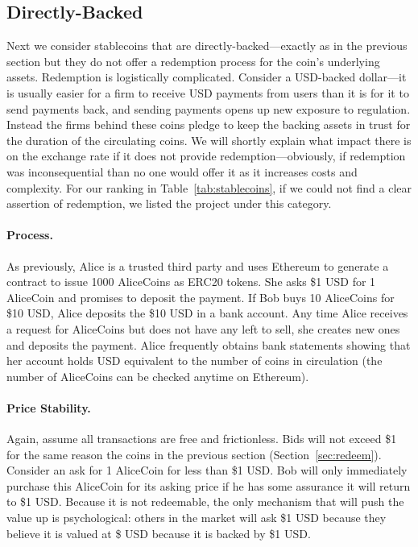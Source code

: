 
\subsection{Directly-Backed}
\label{sec:tether}

Next we consider stablecoins that are directly-backed---exactly as in the previous section but they do not offer a redemption process for the coin's underlying assets. Redemption is logistically complicated. Consider a USD-backed dollar---it is usually easier for a firm to receive USD payments from users than it is for it to send payments back, and sending payments opens up new exposure to regulation. Instead the firms behind these coins  pledge to keep the backing assets in trust for the duration of the circulating coins. We will shortly explain what impact there is on the exchange rate if it does not provide redemption---obviously, if redemption was inconsequential than no one would offer it as it increases costs and complexity. For our ranking in Table~\ref{tab:stablecoins}, if we could not find a clear assertion of redemption, we listed the project under this category.

\paragraph{Process.} As previously, Alice is a trusted third party and uses Ethereum to generate a contract to issue 1000 AliceCoins as ERC20 tokens. She asks \$1 USD for 1 AliceCoin and promises to deposit the payment. If Bob buys 10 AliceCoins for \$10 USD, Alice deposits the \$10 USD in a bank account. Any time Alice receives a request for AliceCoins but does not have any left to sell, she creates new ones and deposits the payment. Alice frequently obtains bank statements showing that her account holds USD equivalent to the number of coins in circulation (the number of AliceCoins can be checked anytime on Ethereum).

\paragraph{Price Stability.} Again, assume all transactions are free and frictionless. Bids will not exceed \$1 for the same reason the coins in the previous section (Section~\ref{sec:redeem}). Consider an ask for 1 AliceCoin for less than \$1 USD. Bob will only immediately purchase this AliceCoin for its asking price if he has some assurance it will return to \$1 USD. Because it is not redeemable, the only mechanism that will push the value up is psychological: others in the market will ask \$1 USD because they believe it is valued at \$ USD because it is backed by \$1 USD.

